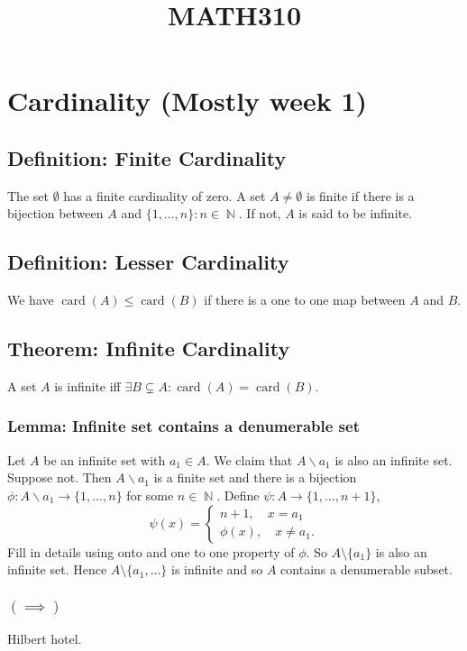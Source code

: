 \documentclass{article}
\title{MATH310}
\DeclareMathOperator\N{\mathbb{N}}
\DeclareMathOperator\cd{card}
\begin{document}
\maketitle{}
\newpage{}

\section*{Cardinality (Mostly week 1)}
\subsection*{Definition: Finite Cardinality}
The set $\emptyset$ has a finite cardinality of zero. A set $A \neq \emptyset$ is finite if there is a bijection between $A$ and $\{1,\hdots,n \}:n \in \N$. If not,
$A$ is said to be infinite.
\subsection*{Definition: Lesser Cardinality}
We have $\cd(A) \leq \cd(B)$ if there is a one to one map between $A$ and $B$.
\subsection*{Theorem: Infinite Cardinality}
A set $A$ is infinite iff $\exists B \subsetneq A: \cd(A) = \cd(B)$.
\subsubsection*{Lemma: Infinite set contains a denumerable set}
Let $A$ be an infinite set with $a_1 \in A$. We claim that $A \backslash a_1$ is also an infinite set. Suppose not. Then
$A \backslash a_1$ is a finite set and there is a bijection $\phi: A \backslash a_1 \to \{1, \hdots, n \}$ for some $n \in \N$.
Define $\psi:A \to \{1, \hdots,n+1 \}$, $$
\psi(x) = \begin{cases}
n+1, \quad x = a_1 \\
\phi(x), \quad x \neq a_1.
\end{cases}
$$
Fill in details using onto and one to one property of $\phi$. So $A \setminus \{a_1\}$ is also an infinite set.
Hence $A \setminus \{ a_1, \hdots \}$ is infinite and so $A$ contains a denumerable subset.
\subsubsection*{$(\implies)$}
Hilbert hotel.
\end{document}
